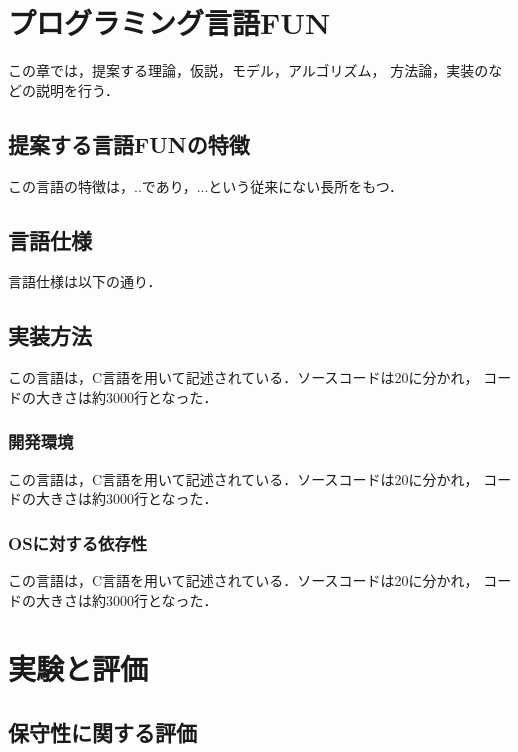 \documentclass{funthesis}
\begin{document}
\chapter{プログラミング言語FUN}

この章では，提案する理論，仮説，モデル，アルゴリズム，
方法論，実装のなどの説明を行う．

\section{提案する言語FUNの特徴}

この言語の特徴は，..であり，...という従来にない長所をもつ．

\section{言語仕様}

言語仕様は以下の通り．


\section{実装方法}

この言語は，C言語を用いて記述されている．ソースコードは20に分かれ，
コードの大きさは約3000行となった．

\subsection{開発環境}

この言語は，C言語を用いて記述されている．ソースコードは20に分かれ，
コードの大きさは約3000行となった．

\subsection{OSに対する依存性}

この言語は，C言語を用いて記述されている．ソースコードは20に分かれ，
コードの大きさは約3000行となった．


\chapter{実験と評価}

\section{保守性に関する評価}
\end{document}
